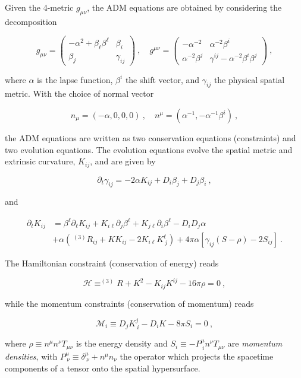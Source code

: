 \documentclass[a4paper,11pt]{article}
\renewcommand{\a}{\alpha}
\renewcommand{\b}{\beta}
\renewcommand{\d}{\delta}
\newcommand{\g}{\gamma}
\newcommand{\gDD}[2]{\g_{{#1}{#2}}}
\newcommand{\gUU}[2]{\g^{{#1}{#2}}}
\newcommand{\GDD}[2]{g_{{#1}{#2}}}
\newcommand{\GUU}[2]{g^{{#1}{#2}}}
\newcommand{\pd}{\partial}
\newcommand{\nn}{\nonumber}
\renewcommand{\H}{\mathcal{H}}
\newcommand{\M}{\mathcal{M}}
\newcommand{\lrpar}[1]{\left( #1 \right)}
\newcommand{\lrsquare}[1]{\left[ #1 \right]}
\newcommand{\n}{\noindent}
\newcommand{\eq}[1]{
  \begin{equation}
    #1
  \end{equation}
}
\newcommand{\al}[1]{
  \begin{align}
    #1
  \end{align}
}
\newcommand{\parboxbreak}[2]{
  
  \vspace*{0.25in}
  
  \begin{tcolorbox}[breakable, pad at break=1mm, before=\centering,title=Box #1,colback=blue!5!white,colframe=gray!75!black]
    #2
  \end{tcolorbox}

  \vspace*{0.25in}

}
\begin{document}
\parboxbreak{1: The ADM equations}{

  Given the 4-metric $\GDD{\mu}{\nu}$, the ADM equations are obtained by considering the decomposition

  \eq{
    \GDD{\mu}{\nu} =
    \begin{pmatrix}
      -\a^{2} + \b_{\ell}\b^{\ell} & \b_{i}\\
      \b_{j} & \gDD{i}{j}
    \end{pmatrix}\ ,
    \quad
    \GUU{\mu}{\nu} =
    \begin{pmatrix}
      -\a^{-2} & \a^{-2}\b^{i}\\
      \a^{-2}\b^{j} & \gUU{i}{j} - \a^{-2}\b^{i}\b^{j}
    \end{pmatrix}\ ,\nn
  }

  \n where $\a$ is the lapse function, $\b^{i}$ the shift vector, and $\gDD{i}{j}$ the physical spatial metric. With the choice of normal vector

  \eq{ n_{\mu} = \lrpar{-\a,0,0,0}\ ,\quad n^{\mu} = \lrpar{\a^{-1},-\a^{-1}\b^{i}}\ ,\nn}

  \n the ADM equations are written as two conservation equations (constraints) and two evolution equations. The evolution equations evolve the spatial metric and extrinsic curvature, $K_{ij}$, and are given by

  \eq{ \pd_{t}\g_{ij} = -2\a K_{ij} + D_{i}\b_{j} + D_{j}\b_{i}\ ,\nn }

  \n and

  \al{
    \pd_{t} K_{ij} &= \b^{\ell}\pd_{\ell}K_{ij} + K_{i\ell}\pd_{j}\b^{\ell} + K_{j\ell}\pd_{i}\b^{\ell} - D_{i}D_{j}\a\nn\\
                  &+\a\lrpar{\,^{(3)}\!R_{ij} + K K_{ij} - 2K_{i\ell}K^{\ell}_{\ j}} + 4\pi\a\lrsquare{\g_{ij}\lrpar{S-\rho} -2S_{ij}}\ .\nn
  }

  The Hamiltonian constraint (conservation of energy) reads

  \eq{ \H \equiv ^{(3)}\!R + K^{2} - K_{ij}K^{ij} - 16\pi\rho = 0\ ,\nn }

  \n while the momentum constraints (conservation of momentum) reads

  \eq{ \M_{i} \equiv D_{j}K^{j}_{\ i} - D_{i}K - 8\pi S_{i} = 0\ , }

  \noindent where $\rho\equiv n^{\mu}n^{\nu}T_{\mu\nu}$ is the energy density and $S_{i} \equiv - P^{\mu}_{\ i}n^{\nu}T_{\mu\nu}$ are \emph{momentum densities}, with $P^{\mu}_{\ \nu} \equiv \d^{\mu}_{\ \nu} + n^{\mu}n_{\nu}$ the operator which projects the spacetime components of a tensor onto the spatial hypersurface.
}
\end{document}
